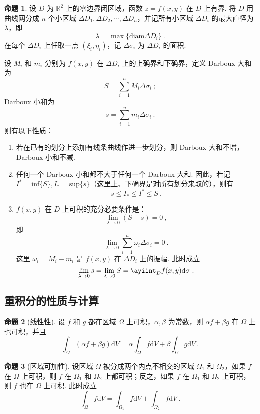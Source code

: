 \documentclass[zihao=-4,linespread=1.8,UTF8,nothm]{aytony_base}
\theoremstyle{definition}
\newtheorem*{proposition*}{\indent\heiti\textbf{命题}}
\begin{document}
\begin{proposition*}
    设 $D$ 为 $\mathbb{R}^2$ 上的零边界闭区域，函数 $z = f(x, y)$ 在 $D$ 上有界. 将 $D$ 用曲线网分成 $n$ 个小区域 ${\Delta D}_1, {\Delta D}_2, \cdots, {\Delta D}_{n}$，并记所有小区域 $\Delta D_i$ 的最大直径为 $\lambda$，即 $$
        \lambda = \max\{\mathrm{diam}\Delta D_i\}\ .
    $$ 在每个 $\Delta D_i$ 上任取一点 $(\xi_i, \eta_i)$，记 $\Delta \sigma_i$ 为 $\Delta D_i$ 的面积.

    设 $M_i$ 和 $m_i$ 分别为 $f(x, y)$ 在 $\Delta D_i$ 上的上确界和下确界，定义 Darboux 大和为 $$
        S = \sum\limits_{i = 1}^{n}M_i\Delta \sigma_i\ ;
    $$ Darboux 小和为 $$
        s = \sum\limits_{i = 1}^{n}m_i\Delta\sigma_i\ .
    $$ 则有以下性质：
    \begin{enumerate}[nosep]
        \item 若在已有的划分上添加有线条曲线作进一步划分，则 Darboux 大和不增，Darboux 小和不减.
        \item 任何一个 Darboux 小和都不大于任何一个 Darboux 大和. 因此，若记 $I^* = \mathrm{inf}\{S\}, I_* = \mathrm{sup}\{s\}$（这里上、下确界是对所有划分来取的），则有 $$
                  s \leqslant I_* \leqslant I^* \leqslant S\ .
              $$
        \item $f(x, y)$ 在 $D$ 上可积的充分必要条件是： $$
                  \lim\limits_{\lambda \to 0} (S - s) = 0\ ,
              $$ 即 $$
                  \lim\limits_{\lambda \to 0} \sum\limits_{i = 1}^{n}\omega_i\Delta\sigma_i = 0\ .
              $$ 这里 $\omega_i = M_i - m_i$ 是 $f(x, y)$ 在 $\Delta D_i$ 上的振幅. 此时成立 $$
                  \lim\limits_{\lambda \to 0} s = \lim\limits_{\lambda \to 0} S = \ayiint_Df(x, y)\mathrm{d}\sigma\ .
              $$
    \end{enumerate}

\end{proposition*}

\subsection{重积分的性质与计算}
\begin{proposition*}[线性性]
    设 $f$ 和 $g$ 都在区域 $\Omega$ 上可积，$\alpha, \beta$ 为常数，则 $\alpha f + \beta g$ 在 $\Omega$ 上也可积，并且 $$
        \int_{\Omega}^{}(\alpha f + \beta g)\mathrm{d}V = \alpha \int_{\Omega}^{}f\mathrm{d}V + \beta\int_{\Omega}^{}g\mathrm{d}V\ .
    $$
\end{proposition*}

\begin{proposition*}[区域可加性]
    设区域 $\Omega$ 被分成两个内点不相交的区域 $\Omega_1$ 和 $\Omega_2$，如果 $f$ 在 $\Omega$ 上可积，则 $f$ 在 $\Omega_1$ 和 $\Omega_2$ 上都可积；反之，如果 $f$ 在 $\Omega_1$ 和 $\Omega_2$ 上可积，则 $f$ 也在 $\Omega$ 上可积. 此时成立 $$
        \int_{\Omega}^{}f\mathrm{d}V = \int_{\Omega_1}^{}f\mathrm{d}V + \int_{\Omega_2}^{}f\mathrm{d}V\ .
    $$
\end{proposition*}
\end{document}
